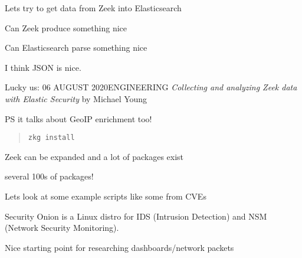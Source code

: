 \documentclass[Screen16to9,17pt]{foils}
\begin{document}


\begin{list2}
\item Lets try to get data from Zeek into Elasticsearch
\item Can Zeek produce something nice
\item Can Elasticsearch parse something nice
\item I think JSON is nice.
\item Lucky us:
06 AUGUST 2020ENGINEERING
\emph{Collecting and analyzing Zeek data with Elastic Security}
by Michael Young\\
\item PS it talks about GeoIP enrichment too!
\end{list2}





\begin{quote}
\verb+zkg install +
\end{quote}

\begin{list2}
\item Zeek can be expanded and a lot of packages exist
\item {} several 100s of packages!
\item Lets look at some example scripts like some from CVEs
\end{list2}



Security Onion is a Linux distro for IDS (Intrusion Detection) and NSM (Network Security Monitoring).\\

\centerline{Nice starting point for researching dashboards/network packets}




\slidenext{}
\end{document}
